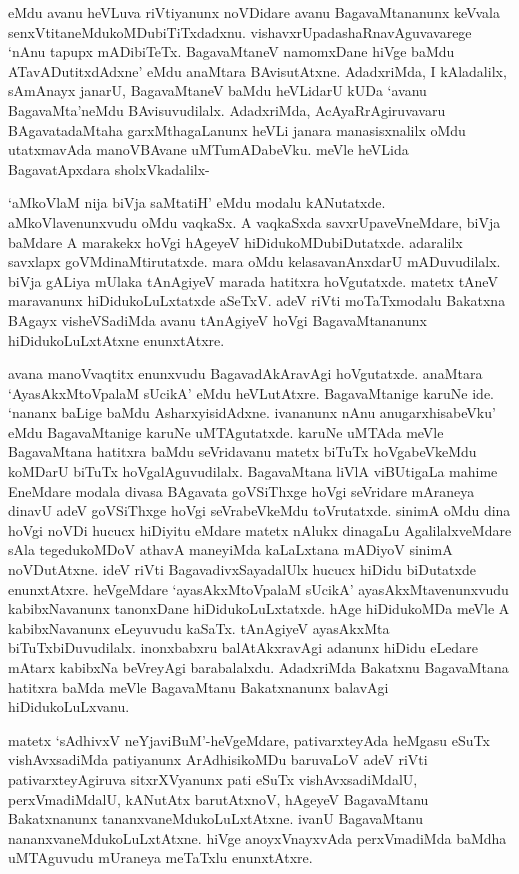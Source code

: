 eMdu avanu heVLuva riVtiyanunx noVDidare avanu BagavaMtananunx keVvala 
senxVtitaneMdukoMDubiTiTxdadxnu. vishavxrUpadashaRnavAguvavarege `nAnu tapupx mADibiTeTx. BagavaMtaneV namomxDane hiVge baMdu ATavADutitxdAdxne' eMdu anaMtara BAvisutAtxne. AdadxriMda, I kAladalilx, sAmAnayx janarU, BagavaMtaneV baMdu heVLidarU kUDa `avanu BagavaMta'neMdu BAvisuvudilalx. AdadxriMda, AcAyaRrAgiruvavaru BAgavatadaMtaha garxMthagaLanunx heVLi janara manasisxnalilx oMdu utatxmavAda manoVBAvane uMTumADabeVku. meVle heVLida BagavatApxdara sholxVkadalilx-

`aMkoVlaM nija biVja saMtatiH' eMdu modalu kANutatxde. aMkoVlavenunxvudu oMdu vaqkaSx. A vaqkaSxda savxrUpaveVneMdare, biVja baMdare A marakekx hoVgi hAgeyeV 
hiDidukoMDubiDutatxde. adaralilx savxlapx goVMdinaMtirutatxde. mara oMdu kelasavanAnxdarU mADuvudilalx. biVja gALiya mUlaka tAnAgiyeV 
marada hatitxra hoVgutatxde. matetx tAneV maravanunx hiDidukoLuLxtatxde aSeTxV. adeV riVti moTaTxmodalu Bakatxna BAgayx visheVSadiMda avanu tAnAgiyeV hoVgi BagavaMtananunx hiDidukoLuLxtAtxne enunxtAtxre. 

avana manoVvaqtitx enunxvudu BagavadAkAravAgi hoVgutatxde. anaMtara `AyasAkxMtoVpalaM sUcikA' eMdu heVLutAtxre. BagavaMtanige karuNe ide. `nananx baLige baMdu AsharxyisidAdxne. ivananunx nAnu anugarxhisabeVku' eMdu BagavaMtanige karuNe uMTAgutatxde. karuNe uMTAda meVle BagavaMtana hatitxra baMdu seVridavanu matetx biTuTx hoVgabeVkeMdu koMDarU biTuTx hoVgalAguvudilalx. BagavaMtana liVlA viBUtigaLa mahime EneMdare modala divasa BAgavata goVSiThxge hoVgi seVridare mAraneya dinavU adeV goVSiThxge hoVgi seVrabeVkeMdu toVrutatxde. sinimA oMdu dina hoVgi noVDi hucucx hiDiyitu eMdare matetx nAlukx dinagaLu AgalilalxveMdare sAla tegedukoMDoV athavA maneyiMda kaLaLxtana mADiyoV sinimA noVDutAtxne. ideV riVti BagavadivxSayadalUlx hucucx hiDidu biDutatxde enunxtAtxre. heVgeMdare `ayasAkxMtoVpalaM sUcikA' ayasAkxMtavenunxvudu kabibxNavanunx tanonxDane hiDidukoLuLxtatxde. hAge hiDidukoMDa meVle A kabibxNavanunx eLeyuvudu kaSaTx. tAnAgiyeV ayasAkxMta biTuTxbiDuvudilalx. inonxbabxru balAtAkxravAgi adanunx hiDidu eLedare mAtarx kabibxNa beVreyAgi barabalalxdu. AdadxriMda Bakatxnu BagavaMtana hatitxra baMda meVle BagavaMtanu Bakatxnanunx balavAgi hiDidukoLuLxvanu. 

matetx `sAdhivxV neYjaviBuM'-heVgeMdare, pativarxteyAda heMgasu eSuTx vishAvxsadiMda patiyanunx ArAdhisikoMDu baruvaLoV adeV riVti pativarxteyAgiruva sitxrXVyanunx pati eSuTx vishAvxsadiMdalU, perxVmadiMdalU, kANutAtx barutAtxnoV, hAgeyeV BagavaMtanu Bakatxnanunx tananxvaneMdukoLuLxtAtxne. ivanU BagavaMtanu nananxvaneMdukoLuLxtAtxne. hiVge anoyxVnayxvAda perxVmadiMda baMdha uMTAguvudu mUraneya meTaTxlu enunxtAtxre.

